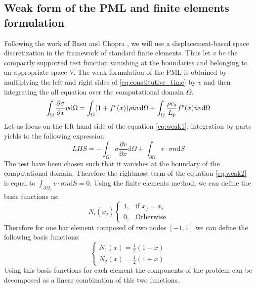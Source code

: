 \subsection{Weak form of the PML and finite elements formulation}
Following the work of Basu and Chopra \cite{Basu2003}, we will use a displacement-based space discretization in the framework of standard finite elements. Thus let $v$ be the compactly supported test function vanishing at the boundaries and belonging to an appropriate space $V$. The weak formulation of the PML is obtained by multiplying the left and right sides of \ref{eq:constitutive_time} by $v$ and then integrating the all equation over the computational domain $\Omega$. 
\begin{equation}
    \int_{\Omega} \frac{\partial \sigma}{\partial x} v \mathrm{d}\Omega =  \int_{\Omega}  (1+f^e(x))\rho \Ddot{u} v \mathrm{d}\Omega + \int_{\Omega}  \frac{\rho c_s}{L_p} f^p(x) \Dot{u}v \mathrm{d}\Omega
     \label{eq:weak1}
\end{equation}
Let us focus on the left hand side of the equation \ref{eq:weak1}, integration by parts yields to the following expression:
\begin{equation}
    LHS = -\int_{\Omega}\sigma \frac{\partial v }{\partial x} \mathrm{d}\Omega + \int_{\partial \Omega} v \cdot \sigma n \mathrm{d}S
    \label{eq:weak2}
\end{equation}
The test have been chosen such that it vanishes at the boundary of the computational domain. Therefore the rightmost term of the equation \ref{eq:weak2} is equal to $\int_{\partial \Omega_p} v \cdot \sigma n \mathrm{d}S= 0$. Using the finite elements method, we can define the basis functions as:
\begin{equation}
    N_i(x_j) \begin{cases}
               1, & \text{if $x_j = x_i $}\\
               0, & \text{Otherwise}
            \end{cases} 
\end{equation}
Therefore for one bar element composed of two nodes $[-1, 1]$ we can define the following basis functions:
\begin{equation}
\begin{cases}
   N_1(x) = \frac{1}{2}(1-x)\\
   N_2(x) = \frac{1}{2}(1+x)
\end{cases} 
\end{equation}
Using this basis functions for each element the components of the problem can be decomposed as a linear combination of this two functions.
